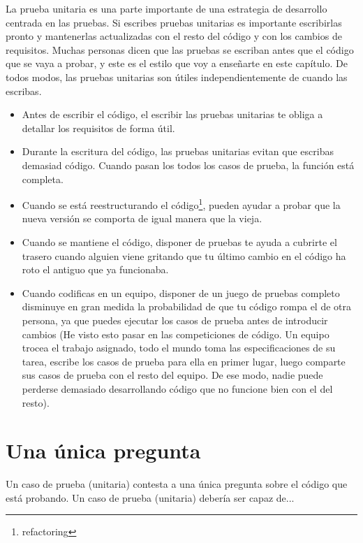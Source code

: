 La prueba unitaria es una parte importante de una estrategia de desarrollo centrada en las pruebas. Si escribes pruebas unitarias es importante escribirlas pronto y mantenerlas actualizadas con el resto del código y con los cambios de requisitos. Muchas personas dicen que las pruebas se escriban antes que el código que se vaya a probar, y este es el estilo que voy a enseñarte en este capítulo. De todos modos, las pruebas unitarias son útiles independientemente de cuando las escribas.

\begin{itemize}

\item Antes de escribir el código, el escribir las pruebas unitarias te obliga a detallar los requisitos de forma útil.

\item Durante la escritura del código, las pruebas unitarias evitan que escribas demasiad código. Cuando pasan los todos los casos de prueba, la función está completa.

\item Cuando se está reestructurando el código\footnote{refactoring}, pueden ayudar a probar que la nueva versión se comporta de igual manera que la vieja.

\item Cuando se mantiene el código, disponer de pruebas te ayuda a cubrirte el trasero cuando alguien viene gritando que tu último cambio en el código ha roto el antiguo que ya funcionaba.

\item Cuando codificas en un equipo, disponer de un juego de pruebas completo disminuye en gran medida la probabilidad de que tu código rompa el de otra persona, ya que puedes ejecutar los casos de prueba antes de introducir cambios (He visto esto pasar en las competiciones de código. Un equipo trocea el trabajo asignado, todo el mundo toma las especificaciones de su tarea, escribe los casos de prueba para ella en primer lugar, luego comparte sus casos de prueba con el resto del equipo. De ese modo, nadie puede perderse demasiado desarrollando código que no funcione bien con el del resto).

\end{itemize}

\section{Una única pregunta}

Un caso de prueba (unitaria) contesta a una única pregunta sobre el código que está probando. Un caso de prueba (unitaria) debería ser capaz de...

